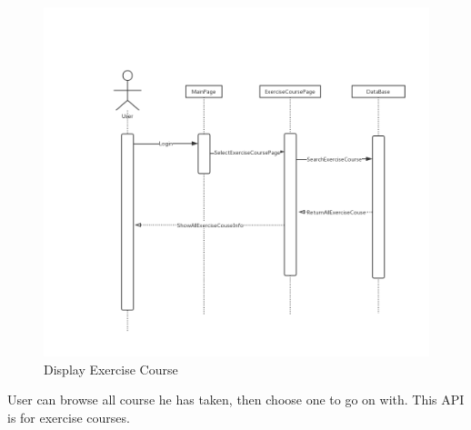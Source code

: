 \documentclass[16pt]{scrreprt}
\begin{document}
\begin{figure}[H]
    \includegraphics[width=\linewidth]{./FuncPhoto/5.png}   
    \caption{Display Exercise Course}
\end{figure}
User can browse all course he has taken, then choose one to go on with. This API is for exercise courses.
\end{document}
